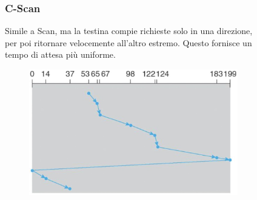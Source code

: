 \begin{figure}[H]
    \centering
    \begin{minipage}{0.5\textwidth}
        \subsubsection*{C-Scan}
        Simile a Scan, ma la testina compie richieste solo in una direzione, per poi ritornare velocemente all'altro estremo. Questo fornisce un tempo di attesa più uniforme.
    \end{minipage}
    \hfill
    \begin{minipage}{0.4\textwidth}
        \begin{figure}[H]
            \centering
            \includegraphics[width=1\linewidth]{assets/c-scan.jpg}
        \end{figure}
    \end{minipage}
\end{figure}

